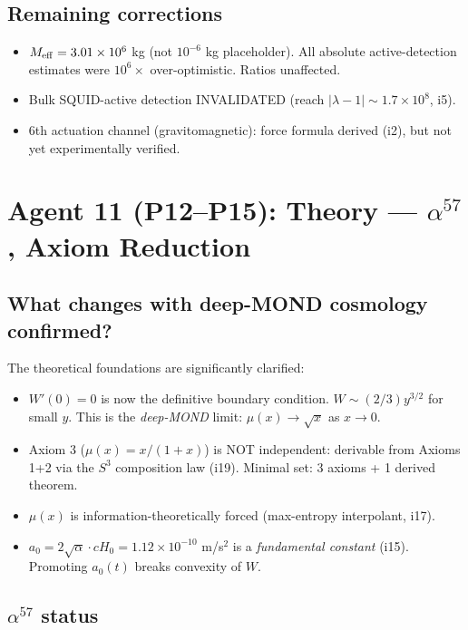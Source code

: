 \documentclass[11pt]{article}
\begin{document}
\subsection{Remaining corrections}
\begin{itemize}
\item $M_{\rm eff} = 3.01 \times 10^6$ kg (not $10^{-6}$ kg placeholder). All
absolute active-detection estimates were $10^6\times$ over-optimistic. Ratios unaffected.
\item Bulk SQUID-active detection INVALIDATED (reach $|\lambda - 1| \sim 1.7 \times 10^8$, i5).
\item 6th actuation channel (gravitomagnetic): force formula derived (i2), but
not yet experimentally verified.
\end{itemize}

\newpage
\section{Agent 11 (P12--P15): Theory --- $\alpha^{57}$, Axiom Reduction}
\label{sec:agent11}

\subsection{What changes with deep-MOND cosmology confirmed?}

The theoretical foundations are significantly clarified:
\begin{itemize}
\item $W'(0) = 0$ is now the definitive boundary condition. $W \sim (2/3)y^{3/2}$
for small $y$. This is the \emph{deep-MOND} limit: $\mu(x) \to \sqrt{x}$ as $x \to 0$.
\item Axiom 3 ($\mu(x) = x/(1+x)$) is NOT independent: derivable from Axioms 1+2
via the $S^3$ composition law (i19). Minimal set: 3 axioms + 1 derived theorem.
\item $\mu(x)$ is information-theoretically forced (max-entropy interpolant, i17).
\item $a_0 = 2\sqrt{\alpha} \cdot cH_0 = 1.12 \times 10^{-10}$ m/s$^2$ is a
\emph{fundamental constant} (i15). Promoting $a_0(t)$ breaks convexity of $W$.
\end{itemize}

\subsection{$\alpha^{57}$ status}
\end{document}
